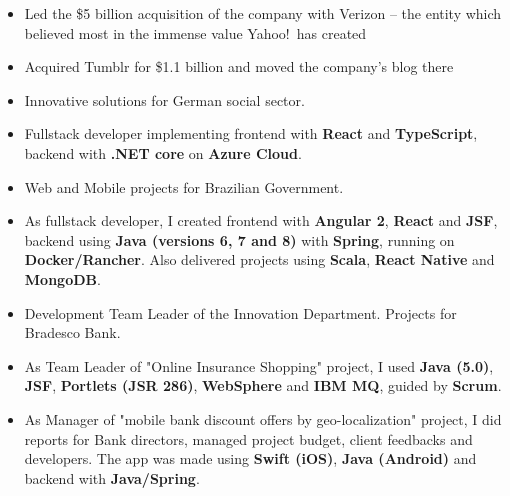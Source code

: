 \documentclass[10pt,a4paper,ragged2e,withhyper]{altacv}
\begin{document}
\begin{paracol}{2}


\begin{itemize}
\item Led the \$5 billion acquisition of the company with Verizon -- the entity which believed most in the immense value Yahoo!\ has created
\item Acquired Tumblr for \$1.1 billion and moved the company's blog there
\end{itemize}
\divider

\begin{itemize}
\item Innovative solutions for German social sector.
\item Fullstack developer implementing frontend with \textbf{React} and \textbf{TypeScript}, backend
with \textbf{.NET core} on \textbf{Azure Cloud}.
\end{itemize}
\divider

\begin{itemize}
\item Web and Mobile projects for Brazilian Government.
\item As fullstack developer, I created frontend with \textbf{Angular 2}, \textbf{React} and \textbf{JSF}, backend using \textbf{Java (versions 6, 7 and 8)} with \textbf{Spring}, running on \textbf{Docker/Rancher}.
Also delivered projects using \textbf{Scala}, \textbf{React Native} and \textbf{MongoDB}.
\end{itemize}
\divider

\begin{itemize}
\item Development Team Leader of the Innovation Department. Projects for Bradesco Bank.
\item As Team Leader of "Online Insurance Shopping" project, I used \textbf{Java (5.0)}, \textbf{JSF}, \textbf{Portlets (JSR 286)}, \textbf{WebSphere} and \textbf{IBM MQ}, guided by \textbf{Scrum}.
\item As Manager of "mobile bank discount offers by geo-localization" project, I did reports for Bank directors, managed project budget, client feedbacks and developers. The app was made using \textbf{Swift (iOS)}, \textbf{Java (Android)} and backend with \textbf{Java/Spring}.
\end{itemize}


\end{paracol}
\end{document}
